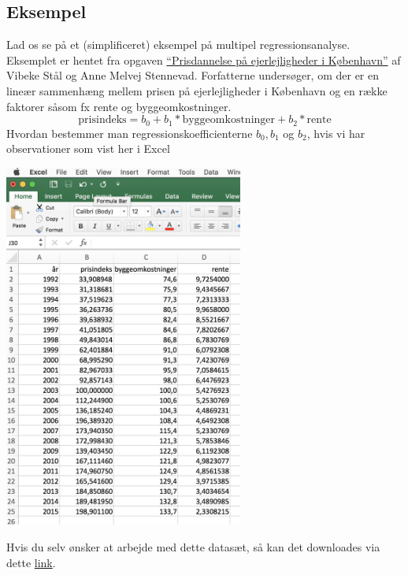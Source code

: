 
\subsection{Eksempel}
Lad os se på et (simplificeret) eksempel på multipel regressionsanalyse. Eksemplet er hentet fra opgaven \href{http://studenttheses.cbs.dk/xmlui/handle/10417/6138}{``Prisdannelse på ejerlejligheder i København''}  af Vibeke Stål og Anne Melvej Stennevad. Forfatterne undersøger, om der er en lineær sammenhæng mellem prisen på ejerlejligheder i København og en række faktorer såsom fx rente og byggeomkostninger.
\begin{displaymath}\label{eq:model}
  \textrm{prisindeks} = b_0 + b_1 * \textrm{byggeomkostninger} + b_2 * \textrm{rente}
\end{displaymath}
Hvordan bestemmer man regressionskoefficienterne \(b_0, b_1\) og \(b_2\), hvis vi har observationer som vist her i Excel
\begin{center}
\includegraphics[height=12cm]{regression/images/data.JPG}
\end{center}
Hvis du selv ønsker at arbejde med dette datasæt, så kan det downloades via dette \href{https://gist.github.com/carsten-j/42595fb16fc646a22bf3f4bec1d81e59/archive/b45e8d1e5e14b83aa16daa652821a8d7b7a3b56d.zip}{link}.

